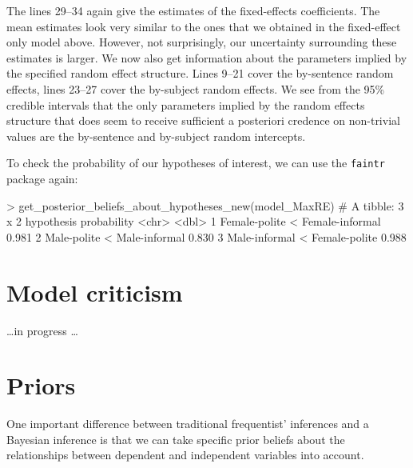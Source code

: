 \documentclass[nobib]{tufte-handout}
\begin{document}
The lines 29--34 again give the estimates of the fixed-effects coefficients. The mean estimates look very similar to the ones that we obtained in the fixed-effect only model above. However, not surprisingly, our uncertainty surrounding these estimates is larger.  
We now also get information about the parameters implied by the specified random effect
structure. Lines 9--21 cover the by-sentence random effects, lines 23--27 cover the by-subject
random effects. We see from the 95\% credible intervals that the only parameters implied by the
random effects structure that does seem to receive sufficient a posteriori credence on
non-trivial values are the by-sentence and by-subject random intercepts.

To check the probability of our hypotheses of interest, we can use the \texttt{faintr} package again:

\medskip

\begin{minipage}[]{\textwidth}
\begin{rc}
> get_posterior_beliefs_about_hypotheses_new(model_MaxRE)
# A tibble: 3 x 2
  hypothesis                      probability
  <chr>                                 <dbl>
1 Female-polite < Female-informal       0.981
2 Male-polite < Male-informal           0.830
3 Male-informal < Female-polite         0.988
\end{rc}
\end{minipage}

\section{Model criticism}

\dots in progress \dots

\section{Priors}

One important difference between traditional frequentist' inferences and a Bayesian inference is that we can take specific prior beliefs about the relationships between dependent and independent variables into account. 
\end{document}
